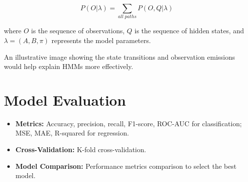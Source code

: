 \[
P(O | \lambda) = \sum_{all \; paths} P(O, Q | \lambda)
\]

where $O$ is the sequence of observations, $Q$ is the sequence of hidden states, and $\lambda = (A, B, \pi)$ represents the model parameters.

An illustrative image showing the state transitions and observation emissions would help explain HMMs more effectively.


\section{Model Evaluation}
\begin{itemize}
    \item \textbf{Metrics:} Accuracy, precision, recall, F1-score, ROC-AUC for classification; MSE, MAE, R-squared for regression.
    \item \textbf{Cross-Validation:} K-fold cross-validation.
    \item \textbf{Model Comparison:} Performance metrics comparison to select the best model.
\end{itemize}

